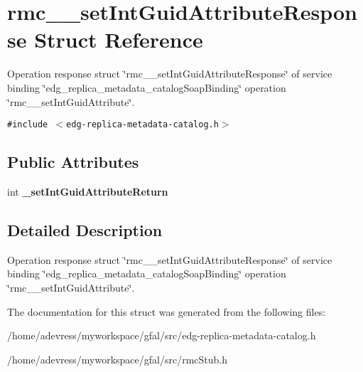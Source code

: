 \section{rmc\_\-\_\-set\-Int\-Guid\-Attribute\-Response Struct Reference}
\label{structrmc____setIntGuidAttributeResponse}
Operation response struct \char`\"{}rmc\_\-\_\-set\-Int\-Guid\-Attribute\-Response\char`\"{} of service binding \char`\"{}edg\_\-replica\_\-metadata\_\-catalog\-Soap\-Binding\char`\"{} operation \char`\"{}rmc\_\-\_\-set\-Int\-Guid\-Attribute\char`\"{}.  


{\tt \#include $<$edg-replica-metadata-catalog.h$>$}

\subsection*{Public Attributes}
\begin{CompactItemize}
\item 
int \textbf{\_\-set\-Int\-Guid\-Attribute\-Return}\label{structrmc____setIntGuidAttributeResponse_57b32762cf5b9411deaea87d0fe1d4f5}

\end{CompactItemize}


\subsection{Detailed Description}
Operation response struct \char`\"{}rmc\_\-\_\-set\-Int\-Guid\-Attribute\-Response\char`\"{} of service binding \char`\"{}edg\_\-replica\_\-metadata\_\-catalog\-Soap\-Binding\char`\"{} operation \char`\"{}rmc\_\-\_\-set\-Int\-Guid\-Attribute\char`\"{}. 



The documentation for this struct was generated from the following files:\begin{CompactItemize}
\item 
/home/adevress/myworkspace/gfal/src/edg-replica-metadata-catalog.h\item 
/home/adevress/myworkspace/gfal/src/rmc\-Stub.h\end{CompactItemize}
